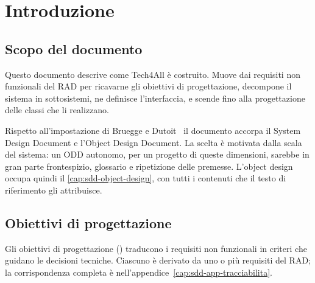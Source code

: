 \chapter{Introduzione}
\label{cap:sdd-introduzione}

\section{Scopo del documento}

Questo documento descrive come Tech4All è costruito. Muove dai requisiti non
funzionali del RAD per ricavarne gli obiettivi di progettazione, decompone il
sistema in sottosistemi, ne definisce l'interfaccia, e scende fino alla
progettazione delle classi che li realizzano.

Rispetto all'impostazione di Bruegge e Dutoit~\cite{bruegge2010} il documento
accorpa il System Design Document e l'Object Design Document. La scelta è
motivata dalla scala del sistema: un ODD autonomo, per un progetto di queste
dimensioni, sarebbe in gran parte frontespizio, glossario e ripetizione delle
premesse. L'object design occupa quindi il \cref{cap:sdd-object-design}, con
tutti i contenuti che il testo di riferimento gli attribuisce.

\section{Obiettivi di progettazione}
\label{sec:sdd-design-goals}

Gli obiettivi di progettazione () traducono i requisiti non
funzionali in criteri che guidano le decisioni tecniche. Ciascuno è derivato
da uno o più requisiti del RAD; la corrispondenza completa è
nell'appendice~\ref{cap:sdd-app-tracciabilita}.

